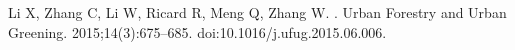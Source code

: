  
Li X, Zhang C, Li W, Ricard R, Meng Q, Zhang W.
.
\newblock Urban Forestry and Urban Greening. 2015;14(3):675--685.
\newblock doi:{10.1016/j.ufug.2015.06.006}.











%
%
%
%
%
%
%
%
%
%
%
